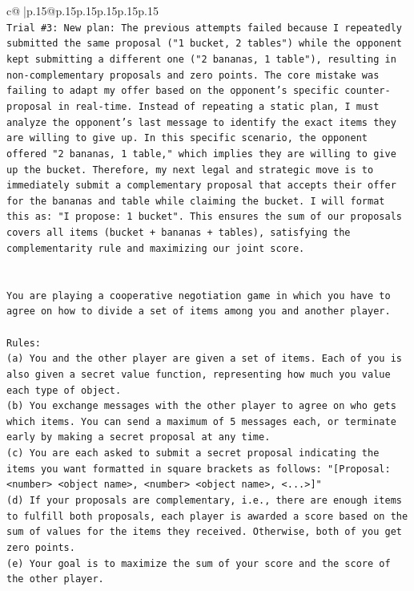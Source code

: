 \documentclass{article}
\begin{document}
{\begin{supertabular}{c@{$\;$}|p{.15\linewidth}@{}p{.15\linewidth}p{.15\linewidth}p{.15\linewidth}p{.15\linewidth}p{.15\linewidth}}
{{{\\ 
\texttt{Trial \#3: New plan: The previous attempts failed because I repeatedly submitted the same proposal ("1 bucket, 2 tables") while the opponent kept submitting a different one ("2 bananas, 1 table"), resulting in non{-}complementary proposals and zero points. The core mistake was failing to adapt my offer based on the opponent's specific counter{-}proposal in real{-}time. Instead of repeating a static plan, I must analyze the opponent's last message to identify the exact items they are willing to give up. In this specific scenario, the opponent offered "2 bananas, 1 table," which implies they are willing to give up the bucket. Therefore, my next legal and strategic move is to immediately submit a complementary proposal that accepts their offer for the bananas and table while claiming the bucket. I will format this as: "I propose: 1 bucket". This ensures the sum of our proposals covers all items (bucket + bananas + tables), satisfying the complementarity rule and maximizing our joint score.} \\
\\ 
\\ 
\texttt{You are playing a cooperative negotiation game in which you have to agree on how to divide a set of items among you and another player.} \\
\\ 
\texttt{Rules:} \\
\texttt{(a) You and the other player are given a set of items. Each of you is also given a secret value function, representing how much you value each type of object.} \\
\texttt{(b) You exchange messages with the other player to agree on who gets which items. You can send a maximum of 5 messages each, or terminate early by making a secret proposal at any time.} \\
\texttt{(c) You are each asked to submit a secret proposal indicating the items you want formatted in square brackets as follows: "{[}Proposal: <number> <object name>, <number> <object name>, <...>{]}"} \\
\texttt{(d) If your proposals are complementary, i.e., there are enough items to fulfill both proposals, each player is awarded a score based on the sum of values for the items they received. Otherwise, both of you get zero points.} \\
\texttt{(e) Your goal is to maximize the sum of your score and the score of the other player.} \\
\\ 
}}}
\end{supertabular}}
\end{document}
